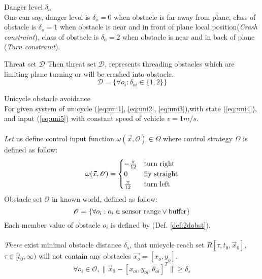\begin{note}{Danger level $\delta_o$}
    \\One can say, danger level is $\delta_o = 0$ when obstacle is far away from plane, class of obstacle is $\delta_o = 1$ when obstacle is near and in front of plane local position(\textit{Crash constraint}), class of obstacle is $\delta_o = 2$ when obstacle is near and in back of plane (\textit{Turn constraint}).
\end{note}


\begin{definition}{Threat set $\mathscr{D}$}\label{def:threatset}
Then threat set $\mathscr{D}$,  represents threading obstacles which are limiting plane turning or will be crashed into obstacle.
\begin{equation}
\mathscr{D} = \{\forall o_i: \delta_{oi} \in \{1,2\}\} 
\end{equation}
\end{definition}

\begin{theorem} {Unicycle obstacle avoidance}\label{theorem1}
\\For given system of unicycle (\ref{eq:uni1}, \ref{eq:uni2}, \ref{eq:uni3}),with state (\ref{eq:uni4}), and input (\ref{eq:uni5}) with constant speed of vehicle $v = 1 m/s$.\\
\\
\textit{Let} us define control input function $ \omega(\vec{x},\mathscr{O}) \in \Omega$ where control strategy $\Omega$ is defined as follow:
\begin{equation}
\label{eq:omegaswitch}
\omega(\vec{x},\mathscr{O}) =
    \begin{cases} 
      -\frac{\pi}{12} & \textnormal{turn right}\\
      0 & \textnormal{fly straight} \\
      \frac{\pi}{12}  & \textnormal{turn left} 
   \end{cases}
\end{equation}
Obstacle set $\mathscr{O}$ in known world, defined as follow:
\begin{equation}
    \mathscr{O} = \{\forall o_i: o_i \in \textnormal{sensor range}  \vee \textnormal{buffer}\}
\end{equation}
Each member value of obstacle $o_i$ is defined by (Def. \ref{def:2dobst}).
\\\\
\textit{There} exist minimal obstacle distance $\delta_s$, that unicycle reach set $R[\tau, t_0, \vec{x}_0]$, $\tau \in [t_0, \infty)$ will not contain any obstacles $\vec{x_o} =[x_o, y_o]$.
\begin{equation}
    \label{eq:deltaw}
    \forall o_i \in \mathscr{O}, \lVert \vec{x}_0 - [x_{oi}, y_{oi}, \theta_{oi}]^T \rVert \ge \delta_s
\end{equation}
\end{theorem}



